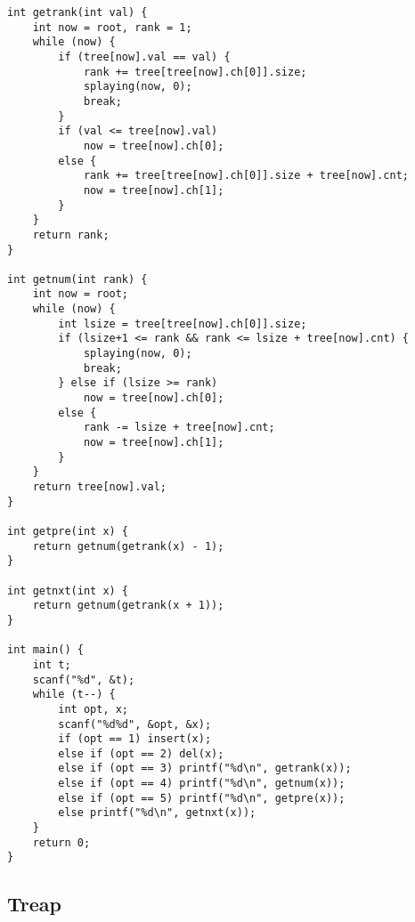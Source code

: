 \begin{lstlisting}
int getrank(int val) {
	int now = root, rank = 1;
	while (now) {
		if (tree[now].val == val) {
			rank += tree[tree[now].ch[0]].size;
			splaying(now, 0);
			break;
		}
		if (val <= tree[now].val)
			now = tree[now].ch[0];
		else {
			rank += tree[tree[now].ch[0]].size + tree[now].cnt;
			now = tree[now].ch[1];
		}
	}
	return rank;
}

int getnum(int rank) {
	int now = root;
	while (now) {
		int lsize = tree[tree[now].ch[0]].size;
		if (lsize+1 <= rank && rank <= lsize + tree[now].cnt) {
			splaying(now, 0);
			break;
		} else if (lsize >= rank)
			now = tree[now].ch[0];
		else {
			rank -= lsize + tree[now].cnt;
			now = tree[now].ch[1];
		}
	}
	return tree[now].val;
}

int getpre(int x) {
	return getnum(getrank(x) - 1);
}

int getnxt(int x) {
	return getnum(getrank(x + 1));
}

int main() {
	int t;
	scanf("%d", &t);
	while (t--) {
		int opt, x;
		scanf("%d%d", &opt, &x);
		if (opt == 1) insert(x);
		else if (opt == 2) del(x);
		else if (opt == 3) printf("%d\n", getrank(x));
		else if (opt == 4) printf("%d\n", getnum(x));
		else if (opt == 5) printf("%d\n", getpre(x));
		else printf("%d\n", getnxt(x));
	}
	return 0;
}
\end{lstlisting}

\subsection{Treap}
